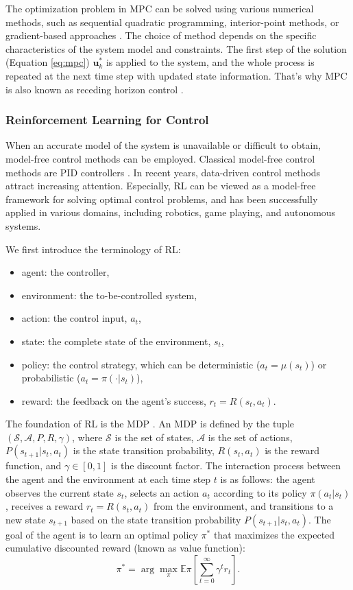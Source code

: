  The optimization problem in \ac{MPC} can be solved using various numerical methods, such as sequential quadratic programming, interior-point methods, or gradient-based approaches \citep{Diehl2013}. The choice of method depends on the specific characteristics of the system model and constraints. The first step of the solution (Equation \ref{eq:mpc}) $\boldsymbol{u}^*_k$ is applied to the system, and the whole process is repeated at the next time step with updated state information. That's why \ac{MPC} is also known as receding horizon control \citep{Christophersen2007}.

\subsubsection{Reinforcement Learning for Control}
When an accurate model of the system is unavailable or difficult to obtain, model-free control methods can be employed. Classical model-free control methods are \ac{PID} controllers \citep{Fliess_2013}. In recent years, data-driven control methods attract increasing attention. Especially, \acf{RL} can be viewed as a model-free framework for solving optimal control problems, and has been successfully applied in various domains, including robotics, game playing, and autonomous systems.

We first introduce the terminology of \ac{RL}:
\begin{itemize}
\item agent: the controller,
\item environment: the to-be-controlled system,
\item action: the control input, $a_t$,
\item state: the complete state of the environment, $s_t$,
\item policy: the control strategy, which can be deterministic ($a_t=\mu(s_t)$) or probabilistic ($a_t=\pi(\cdot|s_t)$),
\item reward: the feedback on the agent's success, $r_t=R(s_t,a_t)$.
\end{itemize}
The foundation of \ac{RL} is the \ac{MDP} \citep{mdp2014}. An \ac{MDP} is defined by the tuple $(\mathcal{S}, \mathcal{A}, P, R, \gamma)$, where $\mathcal{S}$ is the set of states, $\mathcal{A}$ is the set of actions, $P(s_{t+1}|s_t,a_t)$ is the state transition probability, $R(s_t,a_t)$ is the reward function, and $\gamma\in[0,1]$ is the discount factor. The interaction process between the agent and the environment at each time step $t$ is as follows: the agent observes the current state $s_t$, selects an action $a_t$ according to its policy $\pi(a_t|s_t)$, receives a reward $r_t=R(s_t,a_t)$ from the environment, and transitions to a new state $s_{t+1}$ based on the state transition probability $P(s_{t+1}|s_t,a_t)$. The goal of the agent is to learn an optimal policy $\pi^*$ that maximizes the expected cumulative discounted reward (known as value function):
\begin{equation}
    \pi^* = \arg\max_{\pi} \mathbb{E}{\pi}\left[\sum_{t=0}^{\infty} \gamma^t r_t\right].
\end{equation}          

